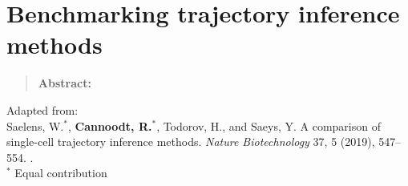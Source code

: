 \newpage{\thispagestyle{empty}\cleardoublepage}
\chapter{Benchmarking trajectory inference methods} 
\label{chap:dynbenchmark}

\begin{quote}
	\textbf{Abstract:} \blindtext
\end{quote}

\vfill

Adapted from:\\
Saelens, W.$^*$, \textbf{Cannoodt, R.}$^*$, Todorov, H., and Saeys, Y. A comparison of single-cell trajectory inference methods. \textit{Nature Biotechnology} 37, 5 (2019), 547--554. .\\
{\footnotesize $^*$ Equal contribution}
\newpage

\blindtext